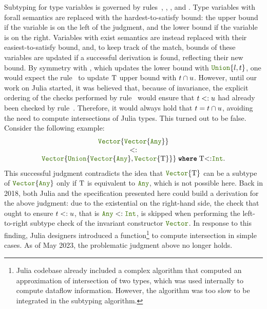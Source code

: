 Subtyping for type variables is governed by
rules~, ,
, and .  Type variables
with forall semantics are replaced with the hardest-to-satisfy bound:
the upper bound if the variable is on the left of the judgment, and
the lower bound if the variable is on the right.  Variables with exist
semantics are instead replaced with their easiest-to-satisfy bound,
and, to keep track of the match, bounds of these variables are updated
if a successful derivation is found, reflecting their new bound.  By
symmetry with , which updates the lower bound with
$\uniontyp{l,\t}$, one would expect the rule~ to update
\(\mathrm{T}\) upper bound with \(t \cap u\). 
However, until our work on Julia started, it
was believed that, because of invariance, the explicit ordering of the
checks performed by rule~ would ensure that \(t <: u\) had
already been checked by rule~.  Therefore, it
would always hold that \(t = t \cap u\), avoiding the need
to compute intersections of Julia types. This
turned out to be false.  Consider the following example:
\[
  \begin{array}{c}
    \vectyp{\vectyp{\anytyp}} \\
    <: \\
    \wheret{\vectyp{\uniontyp{\vectyp{\anytyp}, \vectyp{\T}}}}{\T{<:}\inttyp}.  
  \end{array}
\]\label{juliabug:rleft}
\noindent This successful judgment contradicts the idea that \(\vectyp{\T}\)
can be a subtype of \(\vectyp{\anytyp}\) only if \(\mathrm{T}\) is
equivalent to \(\anytyp\), which is not possible here.
Back in 2018,
both Julia and the specification presented here 
could build a derivation for the above judgment: due to
the existential on the right-hand side, the check that ought to ensure
\(t <: u\), that is \(\anytyp <: \inttyp\), is skipped when
performing the left-to-right subtype check of the invariant
constructor \(\jlname{Vector}\). 
In response to this finding, Julia designers introduced a
 function\footnote{Julia codebase already included a complex
algorithm that computed an approximation of intersection of two types, which
was used internally to compute dataflow information. However, the algorithm 
was too slow %
to be integrated in the subtyping algorithm.}
to compute intersection in simple cases.
As of May 2023, the problematic judgment above no longer holds.

